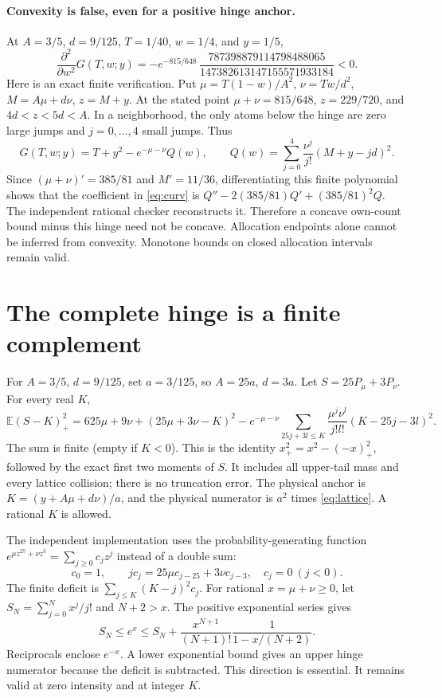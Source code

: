 \documentclass[11pt]{article}
\newcommand{\E}{\mathbb E}
\newcommand{\1}{\mathbf1}
\begin{document}
\paragraph{Convexity is false, even for a positive hinge anchor.}
At $A=3/5$, $d=9/125$, $T=1/40$, $w=1/4$, and $y=1/5$,
\begin{equation}\label{eq:curv}
 \frac{\partial^2}{\partial w^2}G(T,w;y)
 =-e^{-815/648}\,
 \frac{787398879114798488065}{147382613147155571933184}<0.
\end{equation}
Here is an exact finite verification. Put
$\mu=T(1-w)/A^2$, $\nu=Tw/d^2$, $M=A\mu+d\nu$, $z=M+y$.
At the stated point $\mu+\nu=815/648$, $z=229/720$, and
$4d<z<5d<A$. In a neighborhood, the only atoms below the hinge are
zero large jumps and $j=0,\ldots,4$ small jumps. Thus
\[
 G(T,w;y)=T+y^2-e^{-\mu-\nu}Q(w),\qquad
 Q(w)=\sum_{j=0}^4\frac{\nu^j}{j!}(M+y-jd)^2.
\]
Since $(\mu+\nu)'=385/81$ and $M'=11/36$, differentiating this finite
polynomial shows that the coefficient in \eqref{eq:curv} is
$Q''-2(385/81)Q'+(385/81)^2Q$. The independent rational checker
reconstructs it. Therefore a concave own-count bound minus this hinge
need not be concave. Allocation endpoints alone cannot be inferred from
convexity. Monotone bounds on closed allocation intervals remain valid.

\section{The complete hinge is a finite complement}
For $A=3/5$, $d=9/125$, set $a=3/125$, so $A=25a$, $d=3a$.
Let $S=25P_\mu+3P_\nu$. For every real $K$,
\begin{equation}\label{eq:lattice}
 \E(S-K)_+^2=625\mu+9\nu+(25\mu+3\nu-K)^2
 -e^{-\mu-\nu}\sum_{25j+3l\le K}
 \frac{\mu^j\nu^l}{j!l!}(K-25j-3l)^2.
\end{equation}
The sum is finite (empty if $K<0$). This is the identity
$x_+^2=x^2-(-x)_+^2$, followed by the exact first two moments of $S$.
It includes all upper-tail mass and every lattice collision; there is no
truncation error. The physical anchor is
$K=(y+A\mu+d\nu)/a$, and the physical numerator is $a^2$ times
\eqref{eq:lattice}. A rational $K$ is allowed.

The independent implementation uses the probability-generating function
$e^{\mu z^{25}+\nu z^3}=\sum_{j\ge0}c_jz^j$ instead of a double sum:
\[
 c_0=1,\qquad j c_j=25\mu c_{j-25}+3\nu c_{j-3},
 \quad c_j=0\ (j<0).
\]
The finite deficit is $\sum_{j\le K}(K-j)^2c_j$.
For rational $x=\mu+\nu\ge0$, let $S_N=\sum_{j=0}^Nx^j/j!$ and
$N+2>x$. The positive exponential series gives
\[
 S_N\le e^x\le S_N+\frac{x^{N+1}}{(N+1)!}\frac1{1-x/(N+2)}.
\]
Reciprocals enclose $e^{-x}$. A lower exponential bound gives an upper
hinge numerator because the deficit is subtracted. This direction is
essential. It remains valid at zero intensity and at integer $K$.
\end{document}
